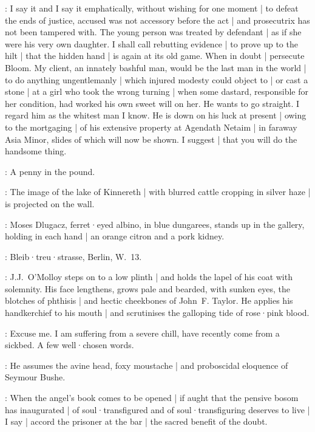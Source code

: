 \JJOM:
I say it
and I say it emphatically,
without wishing for one moment |
to defeat the ends of justice,
accused was not accessory before the act |
and prosecutrix has not been tampered with.
The young person was treated by defendant |
as if she were his very own daughter.
I shall call rebutting evidence |
to prove up to the hilt |
that the hidden hand |
is again at its old game.
When in doubt |
persecute Bloom.
My client,
an innately bashful man,
would be the last man in the world |
to do anything ungentlemanly |
which injured modesty could object to |
or cast a stone |
at a girl who took the wrong turning |
when some dastard,
responsible for her condition,
had worked his own sweet will on her.
He wants to go straight.
I regard him as the whitest man I know.
He is down on his luck at present |
owing to the mortgaging |
of his extensive property at Agendath Netaim |
in faraway Asia Minor,
slides of which will now be shown.
I suggest |
that you will do the handsome thing.

\Bloom:
A penny in the pound.

:
The image of the lake of Kinnereth |
with blurred cattle cropping in silver haze |
is projected on the wall.

:
Moses Dlugacz,
ferret·eyed albino,
in blue dungarees,
stands up in the gallery,
holding in each hand |
an orange citron and a pork kidney.

\Dlugacz:
Bleib·treu·strasse,
Berlin,
W.~13.

:
J.J.~O'Molloy steps on to a low plinth |
and holds the lapel of his coat with solemnity.
His face lengthens,
grows pale and bearded,
with sunken eyes,
the blotches of phthisis |
and hectic cheekbones of John~F. Taylor.
He applies his handkerchief to his mouth |
and scrutinises the galloping tide of rose·pink blood.

\JJOM:
Excuse me.
I am suffering from a severe chill,
have recently come from a sickbed.
A few well·chosen words.

:
He assumes the avine head,
foxy moustache |
and proboscidal eloquence of Seymour Bushe.

\JJOM:
When the angel's book comes to be opened |
if aught that the pensive bosom has inaugurated |
of soul·transfigured and of soul·transfiguring deserves to live |
I say |
accord the prisoner at the bar |
the sacred benefit of the doubt.

